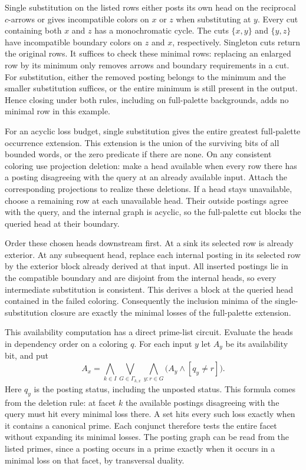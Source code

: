 Single substitution on the listed rows either posts its own head
on the reciprocal $c$-arrows or gives incompatible colors on
$x$ or $z$ when substituting at $y$. Every cut containing both
$x$ and $z$ has a monochromatic cycle. The cuts $\{x,y\}$ and
$\{y,z\}$ have incompatible boundary colors on $z$ and $x$,
respectively. Singleton cuts return the original rows. It suffices
to check these minimal rows: replacing an enlarged row by its
minimum only removes arrows and boundary requirements in a cut.
For substitution, either the removed posting belongs to the
minimum and the smaller substitution suffices, or the entire
minimum is still present in the output. Hence closing under both
rules, including on full-palette backgrounds, adds no minimal
row in this example.

For an acyclic loss budget, single substitution gives
the entire greatest full-palette occurrence extension.
This extension is the union of the surviving bits of
all bounded words, or the zero predicate if there are
none. On any consistent coloring use projection
deletion: make a head available when every row there
has a posting disagreeing with the query at an already
available input. Attach the corresponding projections
to realize these deletions. If a head stays unavailable,
choose a remaining row at each unavailable head.
Their outside postings agree with the query, and the
internal graph is acyclic, so the full-palette cut
blocks the queried head at their boundary.

Order these chosen heads downstream first. At a sink
its selected row is already exterior. At any subsequent
head, replace each internal posting in its selected
row by the exterior block already derived at that
input. All inserted postings lie in the compatible
boundary and are disjoint from the internal heads, so
every intermediate substitution is consistent. This
derives a block at the queried head contained in the
failed coloring. Consequently the inclusion minima
of the single-substitution closure are exactly the
minimal losses of the full-palette extension.

This availability computation has a direct
prime-list circuit. Evaluate the heads in dependency
order on a coloring $q$. For each input $y$ let
$A_y$ be its availability bit, and put
\[
 A_x=\bigwedge_{k\in I}
       \bigvee_{G\in\Gamma_{k,x}}
       \bigwedge_{y:r\in G}
           \bigl(A_y\land[q_y\ne r]\bigr).
\]
Here $q_y$ is the posting status, including the
unposted status. This formula comes from the
deletion rule: at facet $k$ the available postings
disagreeing with the query must hit every minimal
loss there. A set hits every such loss exactly
when it contains a canonical prime. Each conjunct
therefore tests the entire facet without expanding
its minimal losses. The posting graph can be
read from the listed primes, since a posting occurs
in a prime exactly when it occurs in a minimal
loss on that facet, by transversal duality.

